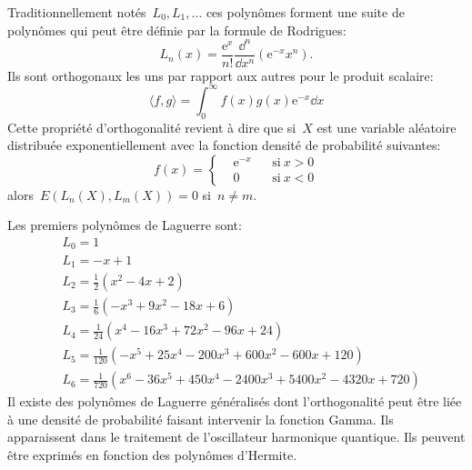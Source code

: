 Traditionnellement notés~$L_0,L_1,\dots$ ces polynômes forment une suite de polynômes qui peut être définie par la formule de Rodrigues: 
\begin{equation}
 L_n(x)=\frac{\mathrm{e}^x}{n!}\frac{\dd^n}{\dd x^n}\left(\mathrm{e}^{-x} x^n\right). 
\end{equation}
Ils sont orthogonaux les uns par rapport aux autres pour le produit scalaire: 
\begin{equation}
\langle f,g \rangle = \int_0^\infty f(x) g(x) \mathrm{e}^{-x}\dd x 
\end{equation}
Cette propriété d'orthogonalité revient à dire que si~$X$ est une variable aléatoire distribuée exponentiellement avec la fonction densité de probabilité suivantes: 
\begin{equation}
 f(x)=\left\{
\begin{aligned}
& \mathrm{e}^{-x} && \mbox{si}\ x>0\\
&0 && \mbox{si}\ x<0
\end{aligned}\right. 
\end{equation}
alors~$E(L_n(X),L_m(X))=0$ si~$n\neq m$. 

\noindent
Les premiers polynômes de Laguerre sont:
\begin{equation}
\begin{aligned}
&L_0 =	1\\
&L_1= 	-x+1\\
&L_2= 	\frac12 (x^2-4x+2)\\
&L_3= 	\frac16 (-x^3+9x^2-18x+6)\\
&L_4= 	\frac1{24} (x^4-16x^3+72x^2-96x+24)\\
&L_5= 	\frac1{120} (-x^5+25x^4-200x^3+600x^2-600x+120)\\
&L_6= 	\frac1{720} (x^6-36x^5+450x^4-2400x^3+5400x^2-4320x+720)
\end{aligned}
\end{equation}
Il existe des polynômes de Laguerre généralisés dont l'orthogonalité peut être liée à une densité de probabilité faisant intervenir la fonction Gamma. Ils apparaissent dans le traitement de l'oscillateur harmonique quantique. Ils peuvent être exprimés en fonction des polynômes d'Hermite. 


